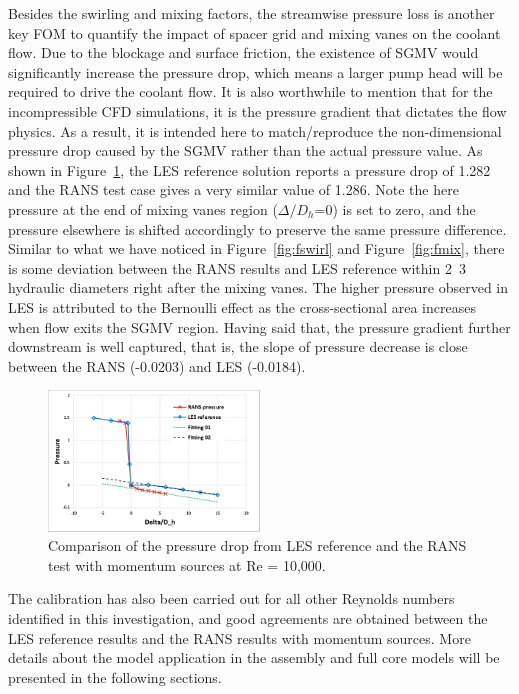 Besides the swirling and mixing factors, the streamwise pressure loss is another key FOM to quantify the impact of spacer grid and mixing vanes on the coolant flow. Due to the blockage and surface friction, the existence of SGMV would significantly increase the pressure drop, which means a larger pump head will be required to drive the coolant flow. It is also worthwhile to mention that for the incompressible CFD simulations, it is the pressure gradient that dictates the flow physics. As a result, it is intended here to match/reproduce the non-dimensional pressure drop caused by the SGMV rather than the actual pressure value. As shown in Figure~\ref{fig:presloss}, the LES reference solution reports a pressure drop of 1.282 and the RANS test case gives a very similar value of 1.286. Note the here pressure at the end of mixing vanes region ($\Delta/D_h$=0) is set to zero, and the pressure elsewhere is shifted accordingly to preserve the same pressure difference. Similar to what we have noticed in Figure~\ref{fig:fswirl} and Figure~\ref{fig:fmix}, there is some deviation between the RANS results and LES reference within 2~3 hydraulic diameters right after the mixing vanes. The higher pressure observed in LES is attributed to the Bernoulli effect as the cross-sectional area increases when flow exits the SGMV region.  Having said that, the pressure gradient further downstream is well captured, that is, the slope of pressure decrease is close between the RANS (-0.0203) and LES (-0.0184).

\begin{figure}[!ht]
\centering
\includegraphics[width=0.5\textwidth]{./figures/Results_pressure_loss.png}
\caption{Comparison of the pressure drop from LES reference and the RANS test with momentum sources at Re = 10,000. }
\label{fig:presloss}
\end{figure}

The calibration has also been carried out for all other Reynolds numbers identified in this investigation, and good agreements are obtained between the LES reference results and the RANS results with momentum sources. More details about the model application in the assembly and full core models will be presented in the following sections. 